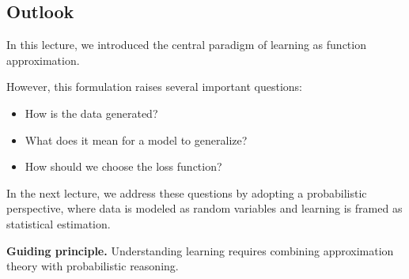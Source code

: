 \subsection{Outlook}

In this lecture, we introduced the central paradigm of learning as function approximation.

\medskip

\noindent
However, this formulation raises several important questions:

\begin{itemize}
    \item How is the data generated?
    \item What does it mean for a model to generalize?
    \item How should we choose the loss function?
\end{itemize}

\medskip

\noindent
In the next lecture, we address these questions by adopting a probabilistic perspective, where data is modeled as random variables and learning is framed as statistical estimation.

\medskip

\noindent
\textbf{Guiding principle.}  
Understanding learning requires combining approximation theory with probabilistic reasoning.
